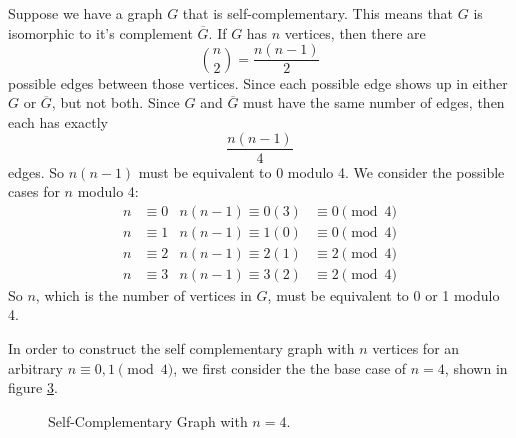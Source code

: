 \documentclass[12pt]{article}
\begin{document}
Suppose we have a graph $G$ that is self-complementary. This means that $G$ is isomorphic to it's complement $\overline{G}$. If $G$ has $n$ vertices, then there are
\[{n \choose 2} = \frac{n(n-1)}{2}\]
possible edges between those vertices. Since each possible edge shows up in either $G$ or $\overline{G}$, but not both. Since $G$ and $\overline{G}$ must have the same number of edges, then each has exactly
\[\frac{n(n-1)}{4}\]
edges. So $n(n-1)$ must be equivalent to 0 modulo 4. We consider the possible cases for $n$ modulo 4:
\begin{align*}
    n &\equiv 0 & n(n-1)\equiv 0(3) & \equiv 0 \pmod{4} \\
    n &\equiv 1 & n(n-1)\equiv 1(0) & \equiv 0 \pmod{4} \\
    n &\equiv 2 & n(n-1)\equiv 2(1) & \equiv 2 \pmod{4} \\
    n &\equiv 3 & n(n-1)\equiv 3(2) & \equiv 2 \pmod{4}
\end{align*}
So $n$, which is the number of vertices in $G$, must be equivalent to 0 or 1 modulo 4.

In order to construct the self complementary graph with $n$ vertices for an arbitrary $n \equiv 0, 1 \pmod{4}$, we first consider the the base case of $n=4$, shown in figure \ref{fig:n4}.

\begin{figure}[ht]
    \centering
    \begin{subfigure}[b]{.3\textwidth}
        \centering
        \caption{}
        \label{fig:n4a}
    \end{subfigure}
    \begin{subfigure}[b]{.3\textwidth}
        \centering
        \caption{}
        \label{fig:n4b}
    \end{subfigure}
    \caption{Self-Complementary Graph with $n=4$.}
    \label{fig:n4}
\end{figure}
\end{document}

